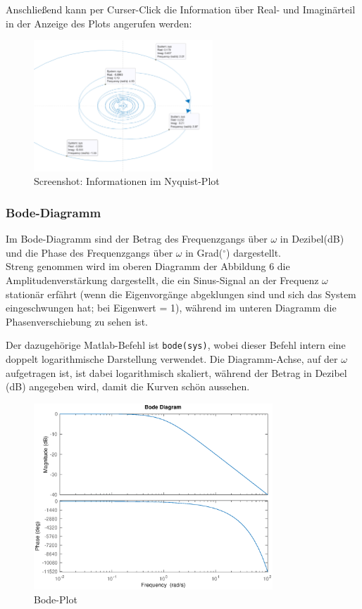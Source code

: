 Anschließend kann per Curser-Click die Information über Real- und Imaginärteil in der Anzeige des Plots angerufen werden:
 \begin{figure}[H]
    \label{fig:nyquistCursor}
    \centering
    \includegraphics[width=0.6\textwidth]{Bilder/NyquistCursorPT1Tt.png}
    \caption{Screenshot: Informationen im Nyquist-Plot}
 \end{figure}

 
\subsubsection{Bode-Diagramm}
Im Bode-Diagramm sind der Betrag des Frequenzgangs über $\omega$ in Dezibel(dB) und die Phase des Frequenzgangs über $\omega$ in Grad($^\circ$) dargestellt.\\
Streng genommen wird im oberen Diagramm der Abbildung 6 die Amplitudenverstärkung dargestellt, die ein Sinus-Signal an der Frequenz $\omega$ stationär erfährt (wenn die Eigenvorgänge abgeklungen sind und sich das System eingeschwungen hat; {\color{blue}bei Eigenwert = 1}), während im unteren Diagramm die Phasenverschiebung zu sehen ist.  

Der dazugehörige Matlab-Befehl ist \texttt{bode(sys)}, wobei dieser Befehl intern eine doppelt logarithmische Darstellung verwendet. Die Diagramm-Achse, auf der $\omega$ aufgetragen ist, ist dabei logarithmisch skaliert, während der Betrag in Dezibel (dB) angegeben wird,  damit die Kurven schön aussehen.

\begin{figure}[H]
    \label{fig:bodePlot}
    \label{fig:lassmich}
    \centering
    \includegraphics[width=0.8\textwidth]{Bilder/BodePT1Tt.eps}
    \caption{Bode-Plot}
 \end{figure}

